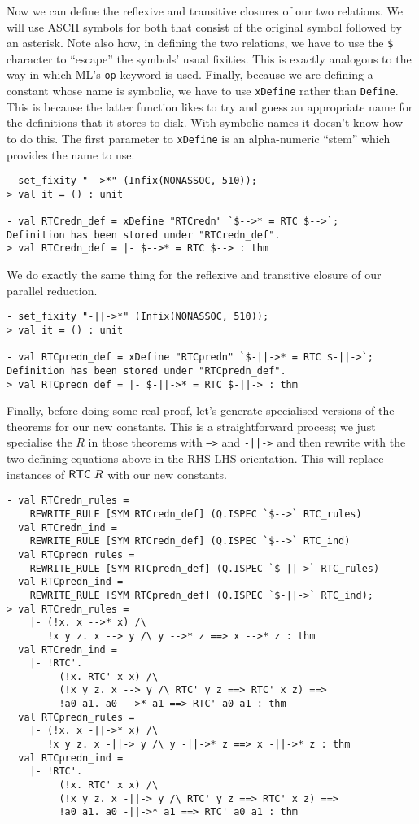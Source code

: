 Now we can define the reflexive and transitive closures of our two
relations.  We will use ASCII symbols for both that consist of the
original symbol followed by an asterisk.  Note also how, in
defining the two relations, we have to use the \texttt{\$} character
to ``escape'' the symbols' usual fixities.  This is exactly analogous
to the way in which ML's \texttt{op} keyword is used.  Finally,
because we are defining a constant whose name is symbolic, we have to
use \texttt{xDefine} rather than \texttt{Define}.  This is because the
latter function likes to try and guess an appropriate name for the
definitions that it stores to disk.  With symbolic names it doesn't
know how to do this.  The first parameter to \texttt{xDefine} is an
alpha-numeric ``stem'' which provides the name to use.
\begin{session}\begin{verbatim}
- set_fixity "-->*" (Infix(NONASSOC, 510));
> val it = () : unit

- val RTCredn_def = xDefine "RTCredn" `$-->* = RTC $-->`;
Definition has been stored under "RTCredn_def".
> val RTCredn_def = |- $-->* = RTC $--> : thm
\end{verbatim}\end{session}
We do exactly the same thing for the reflexive and transitive closure
of our parallel reduction.
\begin{session}\begin{verbatim}
- set_fixity "-||->*" (Infix(NONASSOC, 510));
> val it = () : unit

- val RTCpredn_def = xDefine "RTCpredn" `$-||->* = RTC $-||->`;
Definition has been stored under "RTCpredn_def".
> val RTCpredn_def = |- $-||->* = RTC $-||-> : thm
\end{verbatim}\end{session}
Finally, before doing some real proof, let's generate specialised
versions of the  theorems for our new constants.  This is a
straightforward process; we just specialise the $R$ in those theorems
with \texttt{-->} and \texttt{-||->} and then rewrite with the two
defining equations above in the RHS-LHS orientation.  This will
replace instances of ${\sf RTC}\;R$ with our new constants.
\begin{session}\begin{verbatim}
- val RTCredn_rules =
    REWRITE_RULE [SYM RTCredn_def] (Q.ISPEC `$-->` RTC_rules)
  val RTCredn_ind =
    REWRITE_RULE [SYM RTCredn_def] (Q.ISPEC `$-->` RTC_ind)
  val RTCpredn_rules =
    REWRITE_RULE [SYM RTCpredn_def] (Q.ISPEC `$-||->` RTC_rules)
  val RTCpredn_ind =
    REWRITE_RULE [SYM RTCpredn_def] (Q.ISPEC `$-||->` RTC_ind);
> val RTCredn_rules =
    |- (!x. x -->* x) /\
       !x y z. x --> y /\ y -->* z ==> x -->* z : thm
  val RTCredn_ind =
    |- !RTC'.
         (!x. RTC' x x) /\
         (!x y z. x --> y /\ RTC' y z ==> RTC' x z) ==>
         !a0 a1. a0 -->* a1 ==> RTC' a0 a1 : thm
  val RTCpredn_rules =
    |- (!x. x -||->* x) /\
       !x y z. x -||-> y /\ y -||->* z ==> x -||->* z : thm
  val RTCpredn_ind =
    |- !RTC'.
         (!x. RTC' x x) /\
         (!x y z. x -||-> y /\ RTC' y z ==> RTC' x z) ==>
         !a0 a1. a0 -||->* a1 ==> RTC' a0 a1 : thm
\end{verbatim}\end{session}

